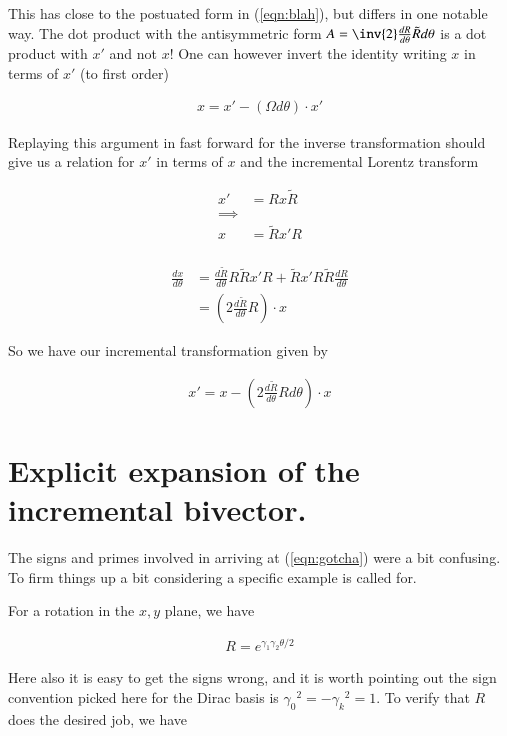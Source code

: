 \documentclass{article}
\begin{document}
This has close to the postuated form in (\ref{eqn:blah}), but differs in one notable way.  The dot product with the antisymmetric form $A = \inv{2} \frac{dR}{d\theta} \tilde{R} d\theta$ is a dot product with $x'$ and not $x$!  One can however 
invert the identity writing $x$ in terms of $x'$ (to first order)

\begin{align*}
x = x' - ( \Omega d\theta ) \cdot x'
\end{align*}

Replaying this argument in fast forward for the inverse transformation should give us a relation for $x'$ in terms of $x$
and the incremental Lorentz transform

\begin{align*}
x' &= R x \tilde{R} \\
\implies \\
x &= \tilde{R} x' {R} \\
\end{align*}

\begin{align*}
\frac{dx}{d\theta}
&= \frac{d \tilde{R}}{d\theta} R \tilde{R} x' R + \tilde{R} x' R \tilde{R} \frac{d {R}}{d\theta}  \\
&= \left(2 \frac{d \tilde{R}}{d\theta} R \right) \cdot x
\end{align*}

So we have our incremental transformation given by

\begin{align}\label{eqn:gotcha}
x'= x - \left(2 \frac{d \tilde{R}}{d\theta} R d\theta \right) \cdot x
\end{align}

\section{Explicit expansion of the incremental bivector.}

The signs and primes involved in arriving at (\ref{eqn:gotcha}) were a bit confusing.  To firm things
up a bit considering a specific example is called for.

For a rotation in the $x,y$ plane, we have

\begin{align*}
R = e^{\gamma_1 \gamma_2 \theta/2}
\end{align*}

Here also it is easy to get the signs wrong, and it is worth pointing out the sign convention picked here for the Dirac basis is ${\gamma_0}^2 = -{\gamma_k}^2 = 1$.  To verify that $R$ does the desired job, we have
\end{document}

